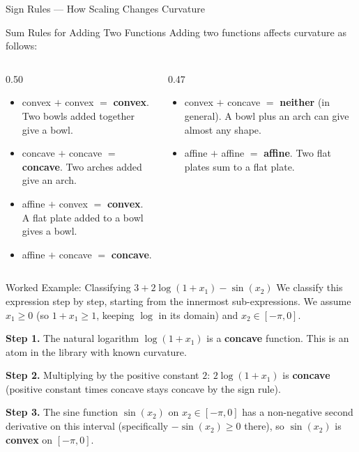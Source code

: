 \documentclass[aspectratio=169,10pt]{beamer}
\begin{document}
\begin{frame}[allowframebreaks]{Sign Rules --- How Scaling Changes Curvature}
  \begin{block}{Sum Rules for Adding Two Functions}
    Adding two functions affects curvature as follows:
    \begin{columns}
      \begin{column}{0.50\textwidth}
        \begin{itemize}
          \item convex $+$ convex $=$ \textbf{convex}.
                Two bowls added together give a bowl.
          \item concave $+$ concave $=$ \textbf{concave}.
                Two arches added give an arch.
          \item affine $+$ convex $=$ \textbf{convex}.
                A flat plate added to a bowl gives a bowl.
          \item affine $+$ concave $=$ \textbf{concave}.
        \end{itemize}
      \end{column}
      \begin{column}{0.47\textwidth}
        \begin{itemize}
          \item convex $+$ concave $=$ \textbf{neither} (in general).
                A bowl plus an arch can give almost any shape.
          \item affine $+$ affine $=$ \textbf{affine}.
                Two flat plates sum to a flat plate.
        \end{itemize}
      \end{column}
    \end{columns}
  \end{block}

  \begin{exampleblock}{Worked Example: Classifying $3 + 2\log(1+x_1) - \sin(x_2)$}
    We classify this expression step by step, starting from the
    innermost sub-expressions.  We assume $x_1 \geq 0$ (so $1 + x_1
    \geq 1$, keeping $\log$ in its domain) and $x_2 \in [-\pi, 0]$.

    \medskip
    \textbf{Step 1.}  The natural logarithm $\log(1+x_1)$ is a
    \textbf{concave} function.  This is an atom in the library with
    known curvature.

    \medskip
    \textbf{Step 2.}  Multiplying by the positive constant $2$:
    $2\log(1+x_1)$ is \textbf{concave} (positive constant times
    concave stays concave by the sign rule).

    \medskip
    \textbf{Step 3.}  The sine function $\sin(x_2)$ on
    $x_2 \in [-\pi, 0]$ has a non-negative second derivative on this
    interval (specifically $-\sin(x_2) \geq 0$ there), so $\sin(x_2)$
    is \textbf{convex} on $[-\pi, 0]$.


\end{exampleblock}
\end{frame}
\end{document}
